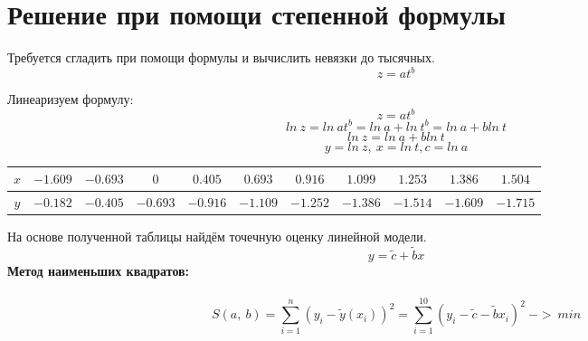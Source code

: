 \documentclass{article}
\begin{document}
\section*{Решение при помощи степенной формулы}
Требуется сгладить при помощи формулы и вычислить невязки до тысячных.
\[ z = at^b \]

Линеаризуем формулу:
\[z = at^b\]
\[ln\ z = ln\ at^b = ln\ a+ln\ t^b = ln\ a +bln\ t\]
\[ln\ z = ln\ a+bln\ t\]
\[y = ln\ z,\ x = ln\ t, c = ln\ a\]
\begin{table}[H]
    \centering
    \begin{tabular}{|c|c|c|c|c|c|c|c|c|c|c|}
        \hline
        $x$ & $-1.609$&$-0.693$&$0 $& $0.405$ & $0.693$ & $0.916$ & $1.099$& $1.253$& $1.386$& $1.504$ \\
        \hline
        $y$ & $-0.182$ & $-0.405$ & $-0.693$ & $-0.916$ & $-1.109$ & $-1.252$& $-1.386$& $-1.514$& $-1.609$& $-1.715$ \\
        \hline
    \end{tabular}
\end{table}
На основе полученной таблицы найдём точечную оценку линейной модели.
\[
y = \tilde{c} + \tilde{b} x
\]
\textbf{Метод наименьших квадратов:}
\\ \\
\[S(a,\ b) = \sum_{i=1}^{n}(y_i - \tilde{y}(x_i))^2 = \sum_{i=1}^{10}(y_i - \tilde{c} - \tilde{b}x_i)^2\ ->\ min\]
\end{document}
